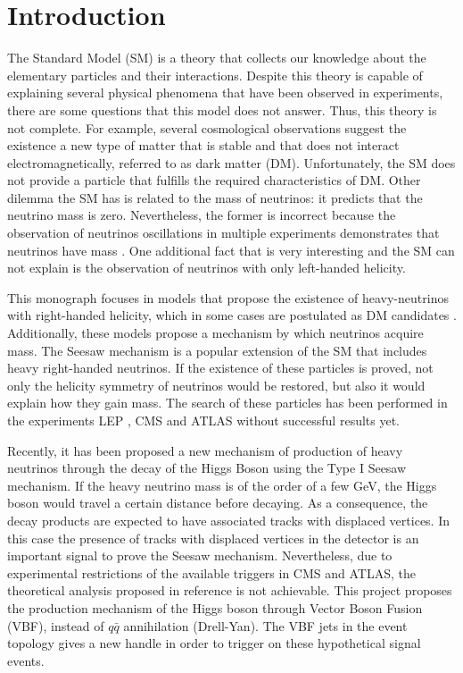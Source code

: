 \chapter{Introduction}
\label{Introduction_chapter}


The Standard Model (SM) is a theory that collects our knowledge about the elementary particles and their interactions. Despite this theory is capable of explaining several physical phenomena that have been observed in experiments, there are some questions that this model does not answer. Thus, this theory is not complete. For example, several cosmological observations suggest the existence a new type of matter that is stable and that does not interact electromagnetically, referred to as dark matter (DM). Unfortunately, the SM does not provide a particle that fulfills the required characteristics of DM. Other dilemma the SM has is related to the mass of neutrinos: it predicts that the neutrino mass is zero. Nevertheless, the former is incorrect because the observation of neutrinos oscillations in multiple experiments demonstrates that neutrinos have mass \cite{Neutrino experiment 1 mass, Neutrino experiment 2 mass}. One additional fact that is very interesting and the SM can not explain is the observation of neutrinos with only left-handed helicity. 

This monograph focuses in models that propose the existence of heavy-neutrinos with right-handed helicity, which in some cases are postulated as DM candidates \cite{Neutrino dark matter candidate 1, Neutrino dark matter candidate 2}. Additionally, these models propose a mechanism by which neutrinos acquire mass. The Seesaw mechanism is a popular extension of the SM that includes heavy right-handed neutrinos. If the existence of these particles is proved, not only the helicity symmetry of neutrinos would be restored, but also it would explain how they gain mass. The search of these particles has been performed in the experiments LEP \cite{Lep experiment}, CMS \cite{CMS experiment} and ATLAS \cite{ATLAS experiment} without successful results yet.

Recently, it has been proposed a new mechanism of production of heavy neutrinos through the decay of the Higgs Boson \cite{Seesaw Mechanism with displaced vertices} using the Type I Seesaw mechanism. If the heavy neutrino mass is of the order of a few GeV, the Higgs boson would travel a certain distance before decaying. As a consequence, the decay products are expected to have associated tracks with displaced vertices. In this case the presence of tracks with displaced vertices in the detector is an important signal to prove the Seesaw mechanism. Nevertheless, due to experimental restrictions of the available triggers in CMS and ATLAS, the theoretical analysis proposed in reference \cite{Seesaw Mechanism with displaced vertices} is not achievable. This project proposes the production mechanism of the Higgs boson through Vector Boson Fusion (VBF), instead of $q\bar{q}$ annihilation (Drell-Yan). The VBF jets in the event topology gives a new handle in order to trigger on these hypothetical signal events.

